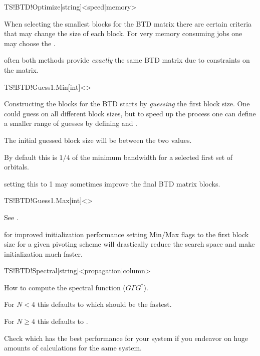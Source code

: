 \begin{fdfentry}{TS!BTD!Optimize}[string]<speed|memory>

  When selecting the smallest blocks for the BTD matrix there are
  certain criteria that may change the size of each block. For very
  memory consuming jobs one may choose the . 

  \note often both methods provide \emph{exactly} the same BTD matrix
  due to constraints on the matrix.
  
\end{fdfentry}

\begin{fdfentry}{TS!BTD!Guess1.Min}[int]<>
  
  Constructing the blocks for the BTD starts by \emph{guessing} the
  first block size. One could guess on all different block sizes, but
  to speed up the process one can define a smaller range of guesses by
  defining  and .

  The initial guessed block size will be between the two values.

  By default this is $1/4$ of the minimum bandwidth for a selected
  first set of orbitals.

  \note setting this to 1 may sometimes improve the final BTD matrix
  blocks.

\end{fdfentry}

\begin{fdfentry}{TS!BTD!Guess1.Max}[int]<>

  See .

  \note for improved initialization performance setting Min/Max flags
  to the first block size for a given pivoting scheme will drastically
  reduce the search space and make initialization much
  faster.

\end{fdfentry}

\begin{fdfentry}{TS!BTD!Spectral}[string]<propagation|column>

  How to compute the spectral function ($G\Gamma G^\dagger$). 

  For $N<4$ this defaults to  which should be the
  fastest.

  For $N\ge4$ this defaults to .

  Check which has the best performance for your system if you endeavor
  on huge amounts of calculations for the same system.

\end{fdfentry}


